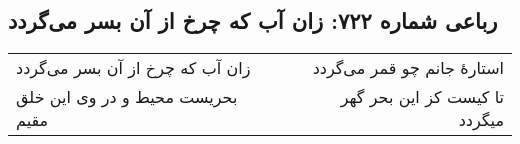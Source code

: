 \begin{center}
\section*{رباعی شماره ۷۲۲: زان آب که چرخ از آن بسر می‌گردد}
\label{sec:0722}
\begin{longtable}{l p{0.5cm} r}
زان آب که چرخ از آن بسر می‌گردد
&&
استارهٔ جانم چو قمر می‌گردد
\\
بحریست محیط و در وی این خلق مقیم
&&
تا کیست کز این بحر گهر میگردد
\\
\end{longtable}
\end{center}
